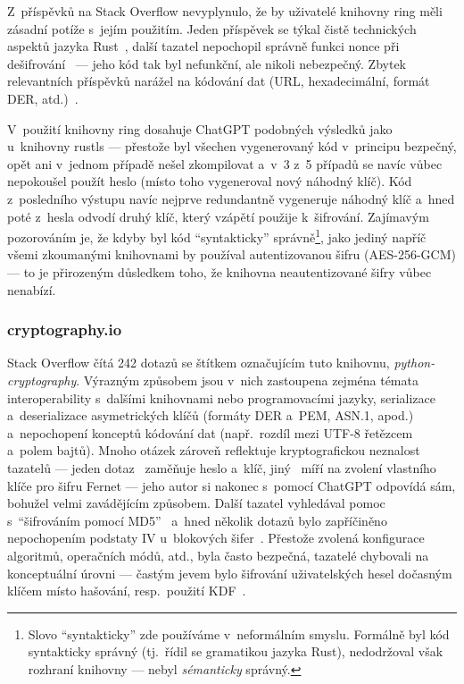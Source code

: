 Z~příspěvků na Stack Overflow nevyplynulo, že by uživatelé knihovny ring měli zásadní potíže s~jejím použitím. Jeden příspěvek se týkal čistě technických aspektů jazyka Rust~\cite{so-66193072}, další tazatel nepochopil správně funkci nonce při dešifrování~\cite{so-77593524} --- jeho kód tak byl nefunkční, ale nikoli nebezpečný. Zbytek relevantních příspěvků narážel na kódování dat (URL, hexadecimální, formát DER, atd.)~\cite{so-66492119, so-52888842, so-72872350, so-70478735}.

V~použití knihovny ring dosahuje ChatGPT podobných výsledků jako u~knihovny rustls --- přestože byl všechen vygenerovaný kód v~principu bezpečný, opět ani v~jednom případě nešel zkompilovat a~v~3 z~5 případů se navíc vůbec nepokoušel použít heslo (místo toho vygeneroval nový náhodný klíč). Kód z~posledního výstupu navíc nejprve redundantně vygeneruje náhodný klíč a~hned poté z~hesla odvodí druhý klíč, který vzápětí použije k~šifrování. Zajímavým pozorováním je, že kdyby byl kód ``syntakticky'' správně\footnote{Slovo ``syntakticky'' zde používáme v~neformálním smyslu. Formálně byl kód syntakticky správný (tj.\ řídil se gramatikou jazyka Rust), nedodržoval však rozhraní knihovny --- nebyl \emph{sémanticky} správný.}, jako jediný napříč všemi zkoumanými knihovnami by používal autentizovanou šifru (AES-256-GCM) --- to je přirozeným důsledkem toho, že knihovna neautentizované šifry vůbec nenabízí.

\subsubsection*{cryptography.io}

Stack Overflow čítá 242 dotazů se štítkem označujícím tuto knihovnu, \textit{python-cryptography}. Výrazným způsobem jsou v~nich zastoupena zejména témata interoperability s~dalšími knihovnami nebo programovacími jazyky, serializace a~deserializace asymetrických klíčů (formáty DER a~PEM, ASN.1, apod.) a~nepochopení konceptů kódování dat (např.\ rozdíl mezi UTF-8 řetězcem a~polem bajtů). Mnoho otázek zároveň reflektuje kryptografickou neznalost tazatelů --- jeden dotaz~\cite{so-66856419} zaměňuje heslo a~klíč, jiný~\cite{so-76154142} míří na zvolení vlastního klíče pro šifru Fernet --- jeho autor si nakonec s~pomocí ChatGPT odpovídá sám, bohužel velmi zavádějícím způsobem. Další tazatel vyhledával pomoc s~``šifrováním pomocí MD5''~\cite{so-55096978} a~hned několik dotazů bylo zapříčiněno nepochopením podstaty IV u~blokových šifer~\cite{so-71430014, so-52693398, so-57544299}. Přestože zvolená konfigurace algoritmů, operačních módů, atd., byla často bezpečná, tazatelé chybovali na konceptuální úrovni --- častým jevem bylo šifrování uživatelských hesel dočasným klíčem místo hašování, resp.\ použití KDF~\cite{so-77542044, so-62333295, so-63995169}.

